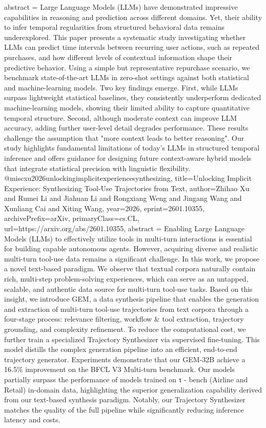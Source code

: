 {      abstract = {Large Language Models (LLMs) have demonstrated impressive capabilities in reasoning and prediction across different domains. Yet, their ability to infer temporal regularities from structured behavioral data remains underexplored. This paper presents a systematic study investigating whether LLMs can predict time intervals between recurring user actions, such as repeated purchases, and how different levels of contextual information shape their predictive behavior. Using a simple but representative repurchase scenario, we benchmark state-of-the-art LLMs in zero-shot settings against both statistical and machine-learning models. Two key findings emerge. First, while LLMs surpass lightweight statistical baselines, they consistently underperform dedicated machine-learning models, showing their limited ability to capture quantitative temporal structure. Second, although moderate context can improve LLM accuracy, adding further user-level detail degrades performance. These results challenge the assumption that "more context leads to better reasoning". Our study highlights fundamental limitations of today's LLMs in structured temporal inference and offers guidance for designing future context-aware hybrid models that integrate statistical precision with linguistic flexibility.}
}@misc{xu2026unlockingimplicitexperiencesynthesizing,
      title={Unlocking Implicit Experience: Synthesizing Tool-Use Trajectories from Text}, 
      author={Zhihao Xu and Rumei Li and Jiahuan Li and Rongxiang Weng and Jingang Wang and Xunliang Cai and Xiting Wang},
      year={2026},
      eprint={2601.10355},
      archivePrefix={arXiv},
      primaryClass={cs.CL},
      url={https://arxiv.org/abs/2601.10355},
      abstract = {Enabling Large Language Models (LLMs) to effectively utilize tools in multi-turn interactions is essential for building capable autonomous agents. However, acquiring diverse and realistic multi-turn tool-use data remains a significant challenge. In this work, we propose a novel text-based paradigm. We observe that textual corpora naturally contain rich, multi-step problem-solving experiences, which can serve as an untapped, scalable, and authentic data source for multi-turn tool-use tasks. Based on this insight, we introduce GEM, a data synthesis pipeline that enables the generation and extraction of multi-turn tool-use trajectories from text corpora through a four-stage process: relevance filtering, workflow & tool extraction, trajectory grounding, and complexity refinement. To reduce the computational cost, we further train a specialized Trajectory Synthesizer via supervised fine-tuning. This model distills the complex generation pipeline into an efficient, end-to-end trajectory generator. Experiments demonstrate that our GEM-32B achieve a 16.5\% improvement on the BFCL V3 Multi-turn benchmark. Our models partially surpass the performance of models trained on τ - bench (Airline and Retail) in-domain data, highlighting the superior generalization capability derived from our text-based synthesis paradigm. Notably, our Trajectory Synthesizer matches the quality of the full pipeline while significantly reducing inference latency and costs.}
}
